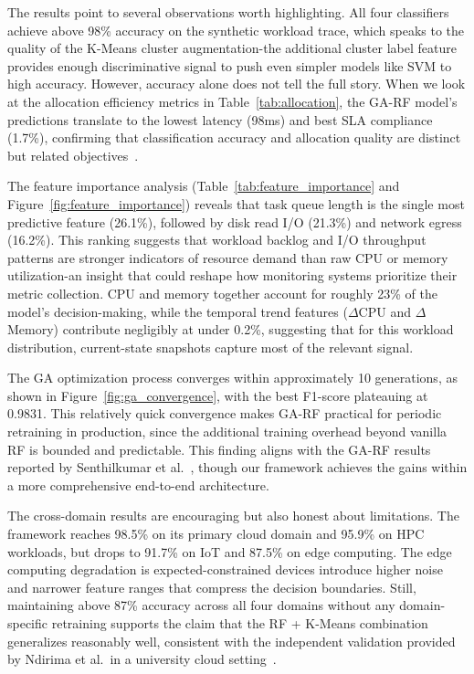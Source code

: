 \documentclass[conference]{IEEEtran}
\begin{document}
The results point to several observations worth highlighting. All four classifiers achieve above 98\% accuracy on the synthetic workload trace, which speaks to the quality of the K-Means cluster augmentation-the additional cluster label feature provides enough discriminative signal to push even simpler models like SVM to high accuracy. However, accuracy alone does not tell the full story. When we look at the allocation efficiency metrics in Table~\ref{tab:allocation}, the GA-RF model's predictions translate to the lowest latency (98ms) and best SLA compliance (1.7\%), confirming that classification accuracy and allocation quality are distinct but related objectives~\cite{Ref7}\cite{Ref8}.

The feature importance analysis (Table~\ref{tab:feature_importance} and Figure~\ref{fig:feature_importance}) reveals that task queue length is the single most predictive feature (26.1\%), followed by disk read I/O (21.3\%) and network egress (16.2\%). This ranking suggests that workload backlog and I/O throughput patterns are stronger indicators of resource demand than raw CPU or memory utilization-an insight that could reshape how monitoring systems prioritize their metric collection. CPU and memory together account for roughly 23\% of the model's decision-making, while the temporal trend features ($\Delta$CPU and $\Delta$Memory) contribute negligibly at under 0.2\%, suggesting that for this workload distribution, current-state snapshots capture most of the relevant signal.

The GA optimization process converges within approximately 10 generations, as shown in Figure~\ref{fig:ga_convergence}, with the best F1-score plateauing at 0.9831. This relatively quick convergence makes GA-RF practical for periodic retraining in production, since the additional training overhead beyond vanilla RF is bounded and predictable. This finding aligns with the GA-RF results reported by Senthilkumar et al.~\cite{Ref3}, though our framework achieves the gains within a more comprehensive end-to-end architecture.

The cross-domain results are encouraging but also honest about limitations. The framework reaches 98.5\% on its primary cloud domain and 95.9\% on HPC workloads, but drops to 91.7\% on IoT and 87.5\% on edge computing. The edge computing degradation is expected-constrained devices introduce higher noise and narrower feature ranges that compress the decision boundaries. Still, maintaining above 87\% accuracy across all four domains without any domain-specific retraining supports the claim that the RF + K-Means combination generalizes reasonably well, consistent with the independent validation provided by Ndirima et al.\ in a university cloud setting~\cite{Ref10}.
\end{document}
